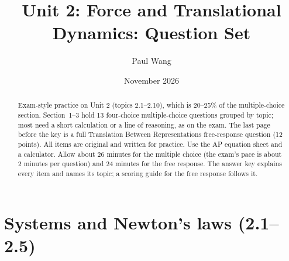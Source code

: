 \documentclass[11pt]{article}
\title{Unit 2: Force and Translational Dynamics: Question Set}
\author{Paul Wang}
\date{November 2026}
\begin{document}
\maketitle

\begin{abstract}
Exam-style practice on Unit 2 (topics 2.1--2.10), which is 20--25\% of the multiple-choice section. Section~1--3 hold 13 four-choice multiple-choice questions grouped by topic; most need a short calculation or a line of reasoning, as on the exam. The last page before the key is a full Translation Between Representations free-response question (12 points). All items are original and written for practice. Use the AP equation sheet and a calculator. Allow about 26 minutes for the multiple choice (the exam's pace is about 2 minutes per question) and 24 minutes for the free response. The answer key explains every item and names its topic; a scoring guide for the free response follows it.
\end{abstract}


\section{Systems and Newton's laws (2.1--2.5)}
\end{document}
